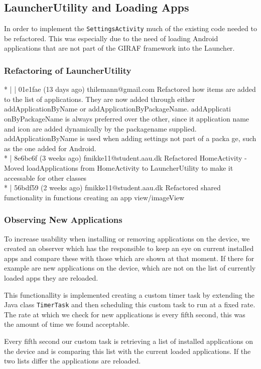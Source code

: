 \subsection{LauncherUtility and Loading Apps}\label{sect:sprint3:refactoring}
In order to implement the \lstinline!SettingsActivity! much of the existing code needed to be refactored.
This was especially due to the need of loading Android applications that are not part of the GIRAF framework  into the Launcher. 

\subsubsection{Refactoring of LauncherUtility}
* | | 01e1fae (13 days ago) thilemann@gmail.com Refactored how items are added to the list of applications. They are now added through either addApplicationByName or addApplicationByPackageName. addApplicati
onByPackageName is always preferred over the other, since it application name and icon are added dynamically by the packagename supplied. addApplicationByName is used when adding settings not part of a packa
ge, such as the one added for Android.\\
* | 8e6bc6f (3 weeks ago) fmikke11@student.aau.dk Refactored HomeActivity - Moved loadApplications from HomeActivity to LauncherUtility to make it accessable for other classes\\
* | 56bdf59 (2 weeks ago) fmikke11@student.aau.dk Refactored shared functionality in functions creating an app view/imageView\\

\subsubsection{Observing New Applications}\label{sec:sprint3:observing}
To increase usability when installing or removing applications on the device, we created an observer which has the responsible to keep an eye on current installed apps and compare these with those which are shown at that moment. If there for example are new applications on the device, which are not on the list of currently loaded apps they are reloaded.

This functionallity is implemented creating a custom timer task by extending the Java class \lstinline!TimerTask! and then scheduling this custom task to run at a fixed rate. The rate at which we check for new applications is every fifth second, this was the amount of time we found acceptable.

Every fifth second our custom task is retrieving a list of installed applications on the device and is comparing this list with the current loaded applications. If the two lists differ the applications are reloaded.